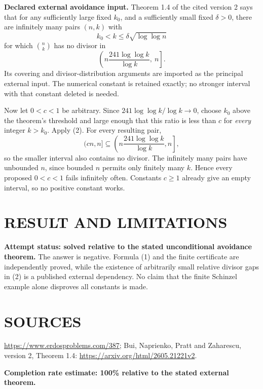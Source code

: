 \textbf{Declared external avoidance input.} Theorem 1.4 of the cited version 2 says that for any sufficiently large fixed $k_0$, and a sufficiently small fixed $\delta>0$, there are infinitely many pairs $(n,k)$ with
\[
k_0<k\leq\delta\sqrt{\log\log n}
\]
for which $\binom nk$ has no divisor in
\[
\left(n\frac{241\log\log k}{\log k},\ n\right].           \tag{2}
\]
Its covering and divisor-distribution arguments are imported as the principal external input. The numerical constant is retained exactly; no stronger interval with that constant deleted is needed.

Now let $0<c<1$ be arbitrary. Since $241\log\log k/\log k\to0$, choose $k_0$ above the theorem's threshold and large enough that this ratio is less than $c$ for \emph{every} integer $k>k_0$. Apply (2). For every resulting pair,
\[
(cn,n]\subseteq\left(n\frac{241\log\log k}{\log k},n\right],
\]
so the smaller interval also contains no divisor. The infinitely many pairs have unbounded $n$, since bounded $n$ permits only finitely many $k$. Hence every proposed $0<c<1$ fails infinitely often. Constants $c\geq1$ already give an empty interval, so no positive constant works.

\section{RESULT AND LIMITATIONS}
\textbf{Attempt status: solved relative to the stated unconditional avoidance theorem.} The answer is negative. Formula (1) and the finite certificate are independently proved, while the existence of arbitrarily small relative divisor gaps in (2) is a published external dependency. No claim that the finite Schinzel example alone disproves all constants is made.

\section{SOURCES}
\url{https://www.erdosproblems.com/387}; Bui, Naprienko, Pratt and Zaharescu, version 2, Theorem 1.4: \url{https://arxiv.org/html/2605.21221v2}.

\textbf{Completion rate estimate: 100\% relative to the stated external theorem.}
